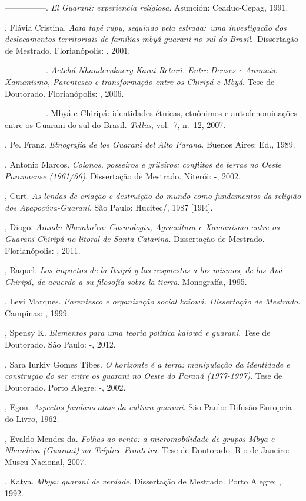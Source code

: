 \begin{Parskip}
—————. \emph{El Guarani: experiencia religiosa}. Asunción: Ceaduc-Cepag, 1991.

, Flávia Cristina. \emph{Aata tapé rupy, seguindo pela estrada:~uma
investigação dos deslocamentos territoriais de famílias mbyá-guarani no
sul do Brasil}.~Dissertação de Mestrado. Florianópolis: , 2001.

—————. \emph{Aetchá Nhanderukuery Karai Retarã. Entre Deuses e Animais:
Xamanismo, Parentesco e transformação entre os Chiripá e Mbyá}. Tese de
Doutorado. Florianópolis: , 2006. 

—————. Mbyá e Chiripá: identidades étnicas, etnônimos e autodenominações
entre os Guarani do sul do Brasil. \emph{Tellus}, vol.~7, n.~12, 2007.

, Pe. Franz. \emph{Etnografia de los Guarani del Alto Parana}. Buenos
Aires:  Ed., 1989.

, Antonio Marcos. \emph{Colonos, posseiros e grileiros: conflitos de
terras no Oeste Paranaense (1961/66)}. Dissertação de Mestrado. Niterói:
-, 2002.

, Curt.  \emph{As lendas de criação e destruição do mundo como
fundamentos da religião dos Apapocúva-Guarani}. São Paulo: Hucitec/,
1987 [19l4].

, Diogo. \emph{Arandu Nhembo’ea: Cosmologia, Agricultura e Xamanismo
entre os Guarani-Chiripá no litoral de Santa Catarina}. Dissertação de
Mestrado. Florianópolis: , 2011.

, Raquel. \emph{Los impactos de la Itaipú y las respuestas a los
mismos, de los Avá Chiripá, de acuerdo a su filosofía sobre la tierra}.
Monografía, 1995.

, Levi Marques. \emph{Parentesco e organização social kaiowá.
Dissertação de Mestrado}. Campinas: , 1999.

, Spensy K. \emph{Elementos para uma teoria política kaiowá e guarani}.
 Tese de Doutorado. São Paulo: -, 2012.

, Sara Iurkiv Gomes Tibes. \emph{O horizonte é a terra: manipulação da
identidade e construção do ser entre os guarani no Oeste do Paraná
(1977-1997)}. Tese de Doutorado. Porto Alegre: -, 2002.

, Egon. \emph{Aspectos fundamentais da cultura guarani}. São Paulo:
Difusão Europeia do Livro, 1962.

, Evaldo Mendes da. \emph{Folhas ao vento: a micromobilidade de grupos
Mbya e Nhandéva (Guarani) na Tríplice Fronteira}. Tese de Doutorado. Rio
de Janeiro: -Museu Nacional, 2007.

, Katya. \emph{Mbya: guarani de verdade}. Dissertação de Mestrado. Porto
Alegre: , 1992.
\end{Parskip}

